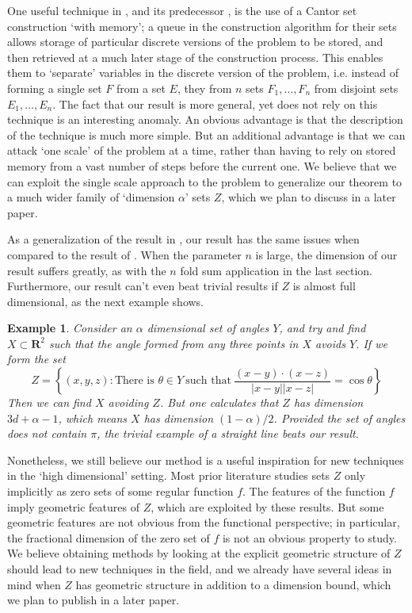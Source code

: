 \documentclass[dvipsnames]{article}
\theoremstyle{plain}
\newtheorem*{example}{Example}
\theoremstyle{plain}
\begin{document}
One useful technique in \cite{MalabikaRob}, and its predecessor \cite{KeletiDimOneSet}, is the use of a Cantor set construction `with memory'; a queue in the construction algorithm for their sets allows storage of particular discrete versions of the problem to be stored, and then retrieved at a much later stage of the construction process. This enables them to `separate' variables in the discrete version of the problem, i.e. instead of forming a single set $F$ from a set $E$, they from $n$ sets $F_1, \dots, F_n$ from disjoint sets $E_1, \dots, E_n$. The fact that our result is more general, yet does not rely on this technique is an interesting anomaly. An obvious advantage is that the description of the technique is much more simple. But an additional advantage is that we can attack `one scale' of the problem at a time, rather than having to rely on stored memory from a vast number of steps before the current one. We believe that we can exploit the single scale approach to the problem to generalize our theorem to a much wider family of `dimension $\alpha$' sets $Z$, which we plan to discuss in a later paper.

As a generalization of the result in \cite{MalabikaRob}, our result has the same issues when compared to the result of \cite{Mathe}. When the parameter $n$ is large, the dimension of our result suffers greatly, as with the $n$ fold sum application in the last section. Furthermore, our result can't even beat trivial results if $Z$ is almost full dimensional, as the next example shows.

\begin{example}
	Consider an $\alpha$ dimensional set of angles $Y$, and try and find $X \subset \mathbf{R}^2$ such that the angle formed from any three points in $X$ avoids $Y$. If we form the set
	\[ Z = \left\{ (x,y,z): \text{There is $\theta \in Y$}\ \text{such that}\ \frac{(x - y) \cdot (x - z)}{|x - y||x - z|} = \cos \theta \right\} \]
	Then we can find $X$ avoiding $Z$. But one calculates that $Z$ has dimension $3d + \alpha - 1$, which means $X$ has dimension $(1 - \alpha) / 2$. Provided the set of angles does not contain $\pi$, the trivial example of a straight line beats our result.
\end{example}

Nonetheless, we still believe our method is a useful inspiration for new techniques in the `high dimensional' setting. Most prior literature studies sets $Z$ only implicitly as zero sets of some regular function $f$. The features of the function $f$ imply geometric features of $Z$, which are exploited by these results. But some geometric features are not obvious from the functional perspective; in particular, the fractional dimension of the zero set of $f$ is not an obvious property to study. We believe obtaining methods by looking at the explicit geometric structure of $Z$ should lead to new techniques in the field, and we already have several ideas in mind when $Z$ has geometric structure in addition to a dimension bound, which we plan to publish in a later paper.
\end{document}
